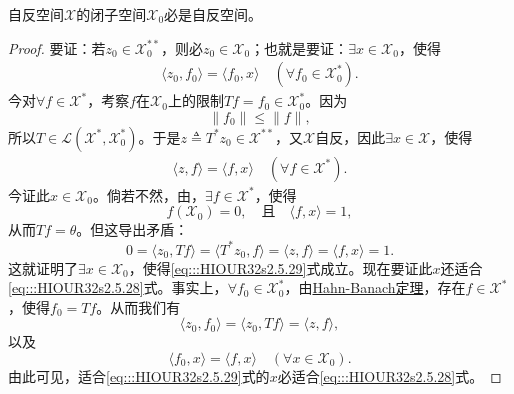 \documentclass[../../main.tex]{subfiles}%
\begin{document}
\begin{theorem}[Pettis定理]
自反空间$\mathscr{X}$的闭子空间$\mathscr{X}_0$必是自反空间。
\end{theorem}
\begin{proof}

要证：若$z_0\in\mathscr{X}_0^{**}$，则必$z_0\in\mathscr{X}_0$；也就是要证：$\exists x\in\mathscr{X}_0$，使得
\begin{align}
\langle z_0,f_0\rangle=\langle f_0,x\rangle\quad(\forall f_0\in\mathscr{X}_0^*).\label{eq:::HIOUR32s2.5.28}
\end{align}
今对$\forall f\in\mathscr{X}^*$，考察$f$在$\mathscr{X}_0$上的限制$Tf=f_0\in\mathscr{X}_0^*$。因为
$$\|f_0\|\leqslant\|f\|,$$
所以$T\in\mathscr{L}(\mathscr{X}^*,\mathscr{X}_0^*)$。于是$z\triangleq T^*z_0\in\mathscr{X}^{**}$，又$\mathscr{X}$自反，因此$\exists x\in\mathscr{X}$，使得
\begin{align}
\langle z,f\rangle=\langle f,x\rangle\quad(\forall f\in\mathscr{X}^*).\label{eq:::HIOUR32s2.5.29}
\end{align}
今证此$x\in\mathscr{X}_0$。倘若不然，由，$\exists f\in\mathscr{X}^*$，使得
$$f(\mathscr{X}_0)=0,\quad\text{且}\quad\langle f,x\rangle=1,$$
从而$Tf=\theta$。但这导出矛盾：
$$0=\langle z_0,Tf\rangle=\langle T^*z_0,f\rangle=\langle z,f\rangle=\langle f,x\rangle=1.$$
这就证明了$\exists x\in\mathscr{X}_0$，使得\eqref{eq:::HIOUR32s2.5.29}式成立。现在要证此$x$还适合\eqref{eq:::HIOUR32s2.5.28}式。事实上，$\forall f_0\in\mathscr{X}_0^*$，由\hyperref[theorem:泛函分析--(哈恩-巴拿赫)Hahn-Banach定理]{Hahn-Banach定理}，存在$f\in\mathscr{X}^*$，使得$f_0=Tf$。从而我们有
$$\langle z_0,f_0\rangle=\langle z_0,Tf\rangle=\langle z,f\rangle,$$
以及
$$\langle f_0,x\rangle=\langle f,x\rangle\quad(\forall x\in\mathscr{X}_0).$$
由此可见，适合\eqref{eq:::HIOUR32s2.5.29}式的$x$必适合\eqref{eq:::HIOUR32s2.5.28}式。

\end{proof}
\end{document}
